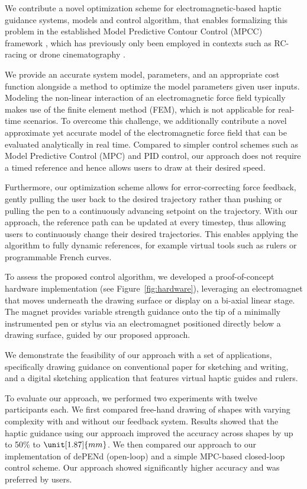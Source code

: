 We contribute a novel optimization scheme for electromagnetic-based haptic guidance systems, \ie models and control algorithm, that enables formalizing this problem in the established Model Predictive Contour Control (MPCC) framework \cite{lam2010model}, which has previously only been employed in contexts such as RC-racing \cite{Liniger2014} or drone cinematography \cite{Naegeli:2017:MultiDroneCine}.

We provide an accurate system model, parameters, and an appropriate cost function alongside a method to optimize the model parameters given user inputs. Modeling the non-linear interaction of an electromagnetic force field typically makes use of the finite element method (FEM), which is not applicable for real-time scenarios. To overcome this challenge, we additionally contribute a novel approximate yet accurate model of the electromagnetic force field that can be evaluated analytically in real time. Compared to simpler control schemes such as Model Predictive Control (MPC) \cite{Faulwasser:2009} and  PID control, our approach does not require a timed reference and hence allows users to draw at their desired speed.

Furthermore, our optimization scheme allows for error-correcting force feedback, gently pulling the user back to the desired trajectory rather than pushing or pulling the pen to a continuously advancing setpoint on the trajectory. With our approach, the reference path can be updated at every timestep, thus allowing users to continuously change their desired trajectories. This enables applying the algorithm to fully dynamic references, for example virtual tools such as rulers or programmable French curves. 

To assess the proposed control algorithm, we developed a proof-of-concept hardware implementation (see Figure~\ref{fig:hardware}), leveraging an electromagnet that moves underneath the drawing surface or display on a bi-axial linear stage. The magnet provides variable strength guidance onto the tip of a minimally instrumented pen or stylus via an electromagnet positioned directly below a drawing surface, guided by our proposed approach.

We demonstrate the feasibility of our approach with a set of applications, specifically drawing guidance on conventional paper for sketching and writing, and a digital sketching application that features virtual haptic guides and rulers.

To evaluate our approach, we performed two experiments with twelve participants each.
We first compared free-hand drawing of shapes with varying complexity with and without our feedback system. Results showed that the haptic guidance using our approach improved the accuracy across shapes by up to 50\% to $\unit[1.87]{mm}$. We then compared our approach to our implementation of dePENd (open-loop) and a simple MPC-based closed-loop control scheme. Our approach showed significantly higher accuracy and was preferred by users.

